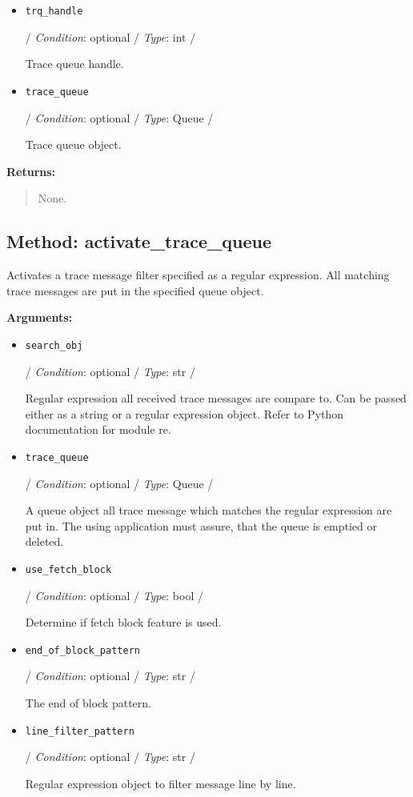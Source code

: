 \begin{itemize}
\item
  \texttt{trq\_handle}

  / \emph{Condition}: optional / \emph{Type}: int /

  Trace queue handle.
\item
  \texttt{trace\_queue}

  / \emph{Condition}: optional / \emph{Type}: Queue /

  Trace queue object.
\end{itemize}

\textbf{Returns:}

\begin{quote}
None.
\end{quote}

\hypertarget{qconnectbase-connection-base-method-activate_trace_queue-16}{%
\subsection{Method:
activate\_trace\_queue}\label{qconnectbase-connection-base-method-activate_trace_queue-16}}

Activates a trace message filter specified as a regular expression. All
matching trace messages are put in the specified queue object.

\textbf{Arguments:}

\begin{itemize}
\item
  \texttt{search\_obj}

  / \emph{Condition}: optional / \emph{Type}: str /

  Regular expression all received trace messages are compare to. Can be
  passed either as a string or a regular expression object. Refer to
  Python documentation for module \textquotesingle re\textquotesingle.
\item
  \texttt{trace\_queue}

  / \emph{Condition}: optional / \emph{Type}: Queue /

  A queue object all trace message which matches the regular expression
  are put in. The using application must assure, that the queue is
  emptied or deleted.
\item
  \texttt{use\_fetch\_block}

  / \emph{Condition}: optional / \emph{Type}: bool /

  Determine if \textquotesingle fetch block\textquotesingle{} feature is
  used.
\item
  \texttt{end\_of\_block\_pattern}

  / \emph{Condition}: optional / \emph{Type}: str /

  The end of block pattern.
\item
  \texttt{line\_filter\_pattern}

  / \emph{Condition}: optional / \emph{Type}: str /

  Regular expression object to filter message line by line.
\end{itemize}

